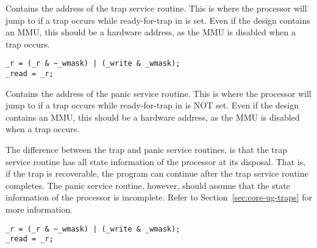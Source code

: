 Contains the address of the trap service routine. This is where the processor
will jump to if a trap occurs while ready-for-trap in  is set. Even if
the design contains an MMU, this should be a hardware address, as the MMU is
disabled when a trap occurs.

\declaration{}
\implementation{}
\begin{lstlisting}
_r = (_r & ~_wmask) | (_write & _wmask);
_read = _r;
\end{lstlisting}


Contains the address of the panic service routine. This is where the processor
will jump to if a trap occurs while ready-for-trap in  is NOT set.
Even if the design contains an MMU, this should be a hardware address, as the
MMU is disabled when a trap occurs.

The difference between the trap and panic service routines, is that the trap
service routine has all state information of the processor at its disposal. That
is, if the trap is recoverable, the program can continue after the trap service
routine completes. The panic service routine, however, should assume that the
state information of the processor is incomplete. Refer to
Section~\ref{sec:core-ug-traps} for more information.

\declaration{}
\implementation{}
\begin{lstlisting}
_r = (_r & ~_wmask) | (_write & _wmask);
_read = _r;
\end{lstlisting}




